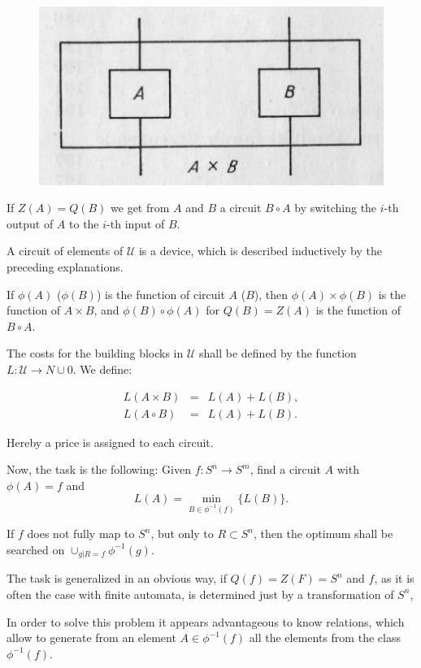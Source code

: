 \documentclass{article}
\begin{document}
\begin{figure}
\includegraphics[]{figure1.png}
\caption{}
\label{fig:figure1}
\end{figure}

If $Z(A) = Q(B)$ we get from $A$ and $B$ a circuit $B\circ A$ by switching the $i$-th output of $A$ to the $i$-th input of $B$.

A circuit of elements of $\mathcal{U}$ is a device, which is described inductively by the preceding explanations.

If $\phi(A)$ ($\phi(B)$) is the function of circuit $A$ ($B$), then $\phi(A)\times \phi(B)$ is the function of $A\times B$, and $\phi(B)\circ \phi(A)$ for $Q(B) = Z(A)$  is the function of $B\circ A$.

The costs for the building blocks in $\mathcal{U}$ shall be defined by the function $L : \mathcal{U} \rightarrow N \cup {0}$. We define:

\[
\begin{array}{lcr}
L(A\times B) & = & L(A) + L(B), \\
L(A\circ B) & = & L(A) + L(B).
\end{array}
\]

Hereby a price is assigned to each circuit.

Now, the task is the following: Given $f : S^n \rightarrow S^m$, find a circuit $A$ with $\phi(A) = f$ and
\[
L(A) = \min_{B \in \phi^{-1}(f)} \{ L(B) \}.
\]

If $f$ does not fully map to $S^n$, but only to $R \subset S^n$, then the optimum shall be searched on $\cup_{g|R=f} \phi^{-1}(g)$. 

The task is generalized in an obvious way, if $Q(f) = Z(F) = S^n$ and $f$, as it is often the case with finite automata, is determined just by a transformation of $S^n$, 

In order to solve this problem it appears advantageous to know relations, which allow to generate from an element $A \in \phi^{-1}(f)$ all the elements from the class $\phi^{-1}(f)$.
\end{document}
